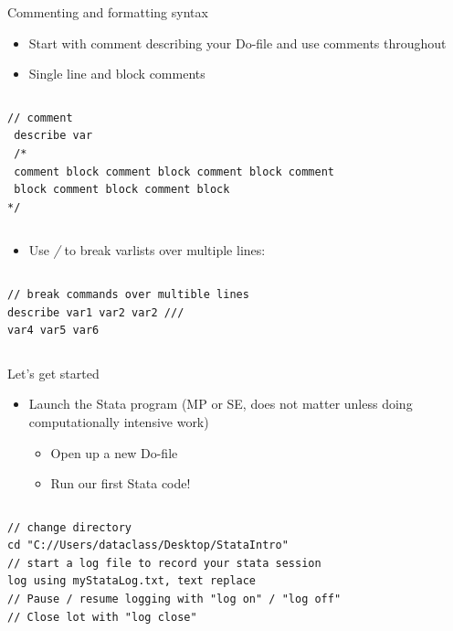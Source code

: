 \documentclass[table,smaller]{beamer}
\begin{document}
\begin{frame}[fragile,label=sec-1-9]{Commenting and formatting syntax}
 \begin{itemize}
\item Start with comment describing your Do-file and use comments throughout
\item Single line and block comments
\end{itemize}
\vspace{-.5em} \begin{columns}  \begin{block}{}
\begin{verbatim}
// comment
 describe var
 /*
 comment block comment block comment block comment
 block comment block comment block 
*/
\end{verbatim}
\end{block} \end{columns}

\begin{itemize}
\item Use \emph{/} to break varlists over multiple lines:
\end{itemize}
\vspace{-.5em} \begin{columns}  \begin{block}{}
\begin{verbatim}
// break commands over multible lines
describe var1 var2 var2 ///
var4 var5 var6
\end{verbatim}
\end{block} \end{columns}
\end{frame}


\begin{frame}[fragile,label=sec-1-10]{Let's get started}
 \begin{itemize}
\item Launch the Stata program (MP or SE, does not matter unless doing computationally intensive work)
\begin{itemize}
\item Open up a new Do-file
\item Run our first Stata code!
\end{itemize}
\end{itemize}

\vspace{-.5em} \begin{columns}  \begin{block}{}
\begin{verbatim}
// change directory
cd "C://Users/dataclass/Desktop/StataIntro"
// start a log file to record your stata session
log using myStataLog.txt, text replace
// Pause / resume logging with "log on" / "log off"
// Close lot with "log close"
\end{verbatim}
\end{block} \end{columns}
\end{frame}
\end{document}
